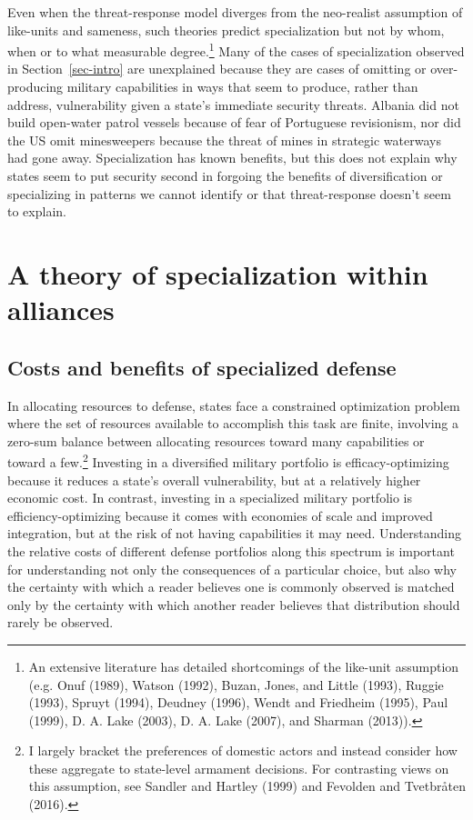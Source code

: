 \documentclass[
  12,
  letterpaper,
  DIV=11,
  numbers=noendperiod]{scrartcl}
\begin{document}
Even when the threat-response model diverges from the neo-realist
assumption of like-units and sameness, such theories predict
specialization but not by whom, when or to what measurable
degree.\footnote{An extensive literature has detailed shortcomings of
  the like-unit assumption (e.g. Onuf (1989), Watson (1992), Buzan,
  Jones, and Little (1993), Ruggie (1993), Spruyt (1994), Deudney
  (1996), Wendt and Friedheim (1995), Paul (1999), D. A. Lake (2003), D.
  A. Lake (2007), and Sharman (2013)).} Many of the cases of
specialization observed in Section~\ref{sec-intro} are unexplained
because they are cases of omitting or over-producing military
capabilities in ways that seem to produce, rather than address,
vulnerability given a state's immediate security threats. Albania did
not build open-water patrol vessels because of fear of Portuguese
revisionism, nor did the US omit minesweepers because the threat of
mines in strategic waterways had gone away. Specialization has known
benefits, but this does not explain why states seem to put security
second in forgoing the benefits of diversification or specializing in
patterns we cannot identify or that threat-response doesn't seem to
explain.

\hypertarget{sec-theory}{%
\section{A theory of specialization within alliances}\label{sec-theory}}

\hypertarget{costs-and-benefits-of-specialized-defense}{%
\subsection{Costs and benefits of specialized
defense}\label{costs-and-benefits-of-specialized-defense}}

In allocating resources to defense, states face a constrained
optimization problem where the set of resources available to accomplish
this task are finite, involving a zero-sum balance between allocating
resources toward many capabilities or toward a few.\footnote{I largely
  bracket the preferences of domestic actors and instead consider how
  these aggregate to state-level armament decisions. For contrasting
  views on this assumption, see Sandler and Hartley (1999) and Fevolden
  and Tvetbråten (2016).} Investing in a diversified military portfolio
is efficacy-optimizing because it reduces a state's overall
vulnerability, but at a relatively higher economic cost. In contrast,
investing in a specialized military portfolio is efficiency-optimizing
because it comes with economies of scale and improved integration, but
at the risk of not having capabilities it may need. Understanding the
relative costs of different defense portfolios along this spectrum is
important for understanding not only the consequences of a particular
choice, but also why the certainty with which a reader believes one is
commonly observed is matched only by the certainty with which another
reader believes that distribution should rarely be observed.
\end{document}
